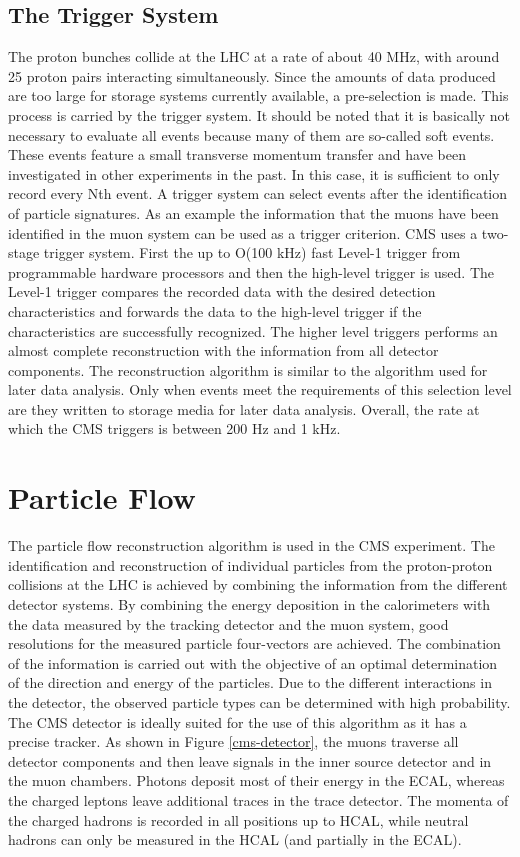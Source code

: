 \documentclass[12pt, a4paper]{thesis}
\begin{document}
\subsection{The Trigger System}
\label{sec:org9d9e9a7}
The proton bunches collide at the LHC at a rate of about 40 MHz, with
around 25 proton pairs interacting simultaneously. Since the amounts
of data produced are too large for storage systems currently
available, a pre-selection is made. This process is carried by the
trigger system. It should be noted that it is basically not necessary
to evaluate all events because many of them are so-called soft
events. These events feature a small transverse momentum transfer and
have been investigated in other experiments in the past. In this case,
it is sufficient to only record every Nth event. A trigger system can
select events after the identification of particle signatures. As an
example the information that the muons have been identified in the
muon system can be used as a trigger criterion. CMS uses a two-stage
trigger system. First the up to O(100 kHz) fast Level-1 trigger from
programmable hardware processors and then the high-level trigger is
used. The Level-1 trigger compares the recorded data with the desired
detection characteristics and forwards the data to the high-level
trigger if the characteristics are successfully recognized. The higher
level triggers performs an almost complete reconstruction with the
information from all detector components. The reconstruction algorithm
is similar to the algorithm used for later data analysis. Only when
events meet the requirements of this selection level are they written
to storage media for later data analysis. Overall, the rate at which
the CMS triggers is between 200 Hz and 1 kHz.

\clearpage
\section{Particle Flow}
\label{sec:eneryflow}

The particle flow reconstruction algorithm is used in the CMS
experiment. The identification and reconstruction of individual
particles from the proton-proton collisions at the LHC is achieved by
combining the information from the different detector systems. By
combining the energy deposition in the calorimeters with the data
measured by the tracking detector and the muon system, good
resolutions for the measured particle four-vectors are achieved. The
combination of the information is carried out with the objective of an
optimal determination of the direction and energy of the
particles. Due to the different interactions in the detector, the
observed particle types can be determined with high probability.  The
CMS detector is ideally suited for the use of this algorithm as it has
a precise tracker. As shown in Figure \ref{cms-detector}, the muons
traverse all detector components and then leave signals in the inner
source detector and in the muon chambers. Photons deposit most of
their energy in the ECAL, whereas the charged leptons leave additional
traces in the trace detector. The momenta of the charged hadrons is
recorded in all positions up to HCAL, while neutral hadrons can only
be measured in the HCAL (and partially in the ECAL).
\end{document}
